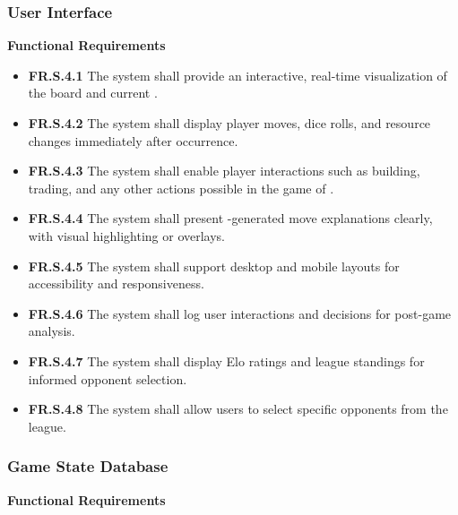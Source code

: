 \documentclass{article}
\begin{document}
\subsubsection{User Interface}

\textbf{Functional Requirements}

\begin{itemize}
  \item \label{FR.S.4.1}\textbf{FR.S.4.1} The system shall provide an interactive, real-time visualization of the \emph{\Catan{}} board and current \GameState{}.
  \item \label{FR.S.4.2}\textbf{FR.S.4.2} The system shall display player moves, dice rolls, and resource changes immediately after occurrence.
  \item \label{FR.S.4.3}\textbf{FR.S.4.3} The system shall enable player interactions such as building, trading, and any other actions possible in the game of \emph{\Catan{}}.
  \item \label{FR.S.4.4}\textbf{FR.S.4.4} The system shall present \LLM{}-generated move explanations clearly, with visual highlighting or overlays.
  \item \label{FR.S.4.5}\textbf{FR.S.4.5} The system shall support desktop and mobile layouts for accessibility and responsiveness.
  \item \label{FR.S.4.6}\textbf{FR.S.4.6} The system shall log user interactions and decisions for post-game analysis.
  \item \label{FR.S.4.7}\textbf{FR.S.4.7} The system shall display Elo ratings and league standings for informed opponent selection.
  \item \label{FR.S.4.8}\textbf{FR.S.4.8} The system shall allow users to select specific opponents from the league.
\end{itemize}


\subsubsection{Game State Database}

\textbf{Functional Requirements}
\end{document}
